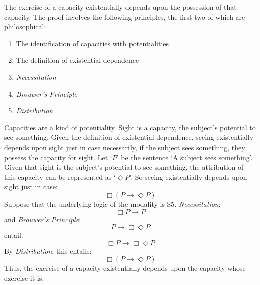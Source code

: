 \documentclass[12pt]{article}
\begin{document}
The exercise of a capacity existentially depends upon the possession of that capacity. The proof involves the following principles, the first two of which are philosophical:
\begin{enumerate}
	\item The identification of capacities with potentialities
	\item The definition of existential dependence
	\item \emph{Necessitation}
	\item \emph{Brouwer's Principle}
	\item \emph{Distribution}
\end{enumerate}
Capacities are a kind of potentiality. Sight is a capacity, the subject's potential to see something. Given the definition of existential dependence, seeing existentially depends upon sight just in case necessarily, if the subject sees something, they possess the capacity for sight. Let `\( P \)' be the sentence `A subject sees something'. Given that sight is the subject's potential to see something, the attribution of this capacity can be represented as `\( \Diamond P \)'. So seeing existentially depends upon sight just in case:
\[
	\Box(P \rightarrow \Diamond P)
\]
Suppose that the underlying logic of the modality is S5. \emph{Necessitation}:
\[
	\Box P \rightarrow P
\]
and \emph{Brouwer's Principle}:
\[
	P \rightarrow \Box \Diamond P
\]
entail:
\[
	\Box P \rightarrow \Box \Diamond P
\]
By \emph{Distribution}, this entails:
\[
	\Box(P \rightarrow \Diamond P)
\]
Thus, the exercise of a capacity existentially depends upon the capacity whose exercise it is.


 
 
\end{document}
